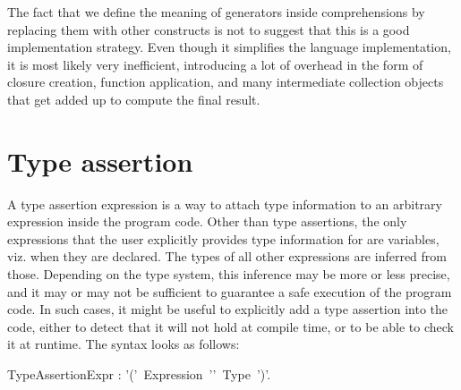 
\begin{implementation}\label{lbl:GeneratorEfficiency}
  The fact that we define the meaning of generators inside
  comprehensions by replacing them with other constructs is not to
  suggest that this is a good implementation strategy. Even though it
  simplifies the language implementation, it is most likely very
  inefficient, introducing a lot of overhead in the form of closure
  creation, function application, and many intermediate collection
  objects that get added up to compute the final result.
\end{implementation}




\section{Type assertion}\label{sect:TypeAssertion}



A type
assertion expression is a way to attach type information to an
arbitrary expression inside the program code. Other than type
assertions, the only expressions that the user explicitly provides
type information for are variables, viz. when they are declared. The
types of all other expressions are inferred from those. Depending on
the type system, this inference may be more or less precise, and it
may or may not be sufficient to guarantee a safe execution of the
program code. In such cases, it might be useful to explicitly add a
type assertion into the code, either to detect that it will not hold
at compile time, or to be able to check it at runtime. The syntax
looks as follows:


\bgr

TypeAssertionExpr : '('~Expression~'\charColon\charColon'~Type~')'.

